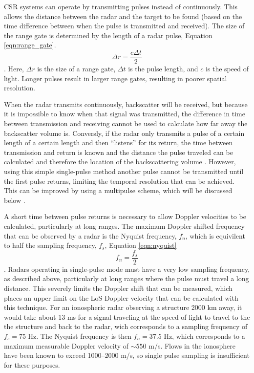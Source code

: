 CSR systems can operate by transmitting pulses instead of continuously.  This allows the distance between the radar and the target to be found (based on the time difference between when the pulse is transmitted and received).  The size of the range gate is determined by the length of a radar pulse, Equation \ref{eqn:range_gate}.\
\begin{equation}
	\label{eqn:range_gate}
	\Delta r = \frac{c\Delta t}{2}
\end{equation}.
Here, \(\Delta r\) is the size of a range gate, \(\Delta t\) is the pulse length, and \(c\) is the speed of light.  Longer pulses result in larger range gates, resulting in poorer spatial resolution.

When the radar transmits continuously, backscatter will be received, but because it is impossible to know when that signal was transmitted, the difference in time between transmission and receiving cannot be used to calculate how far away the backscatter volume is.  Conversly, if the radar only transmits a pulse of a certain length of a certain length and then ``listens'' for its return, the time between transmission and return is known and the distance the pulse traveled can be calculated and therefore the location of the backscattering volume \citep{Farley1972,Greenwald1983}.  However, using this simple single-pulse method another pulse cannot be transmitted until the first pulse returns, limiting the temporal resolution that can be achieved.  This can be improved by using a multipulse scheme, which will be discussed below \citep{Farley1972,Greenwald1983,Greenwald1985}.

A short time between pulse returns is necessary to allow Doppler velocities to be calculated, particularly at long ranges.  The maximum Doppler shifted frequency that can be observed by a radar is the Nyquist frequency, \(f_n\), which is equivilent to half the sampling frequency, \(f_s\), Equation \ref{eqn:nyquist}
\begin{equation}	
	\label{eqn:nyquist}
	f_n = \frac{f_s}{2}
\end{equation}.
Radars operating in single-pulse mode must have a very low sampling frequency, as described above, particularly at long ranges where the pulse must travel a long distance.  This severely limits the Doppler shift that can be measured, which places an upper limit on the LoS Doppler velocity that can be calculated with this technique.  For an ionospheric radar observing a structure 2000 km away, it would take about 13 ms for a signal traveling at the speed of light to travel to the the structure and back to the radar, wich corresponds to a sampling frequency of \(f_s = 75\) Hz.  The Nyquist frequency is then \(f_n = 37.5\) Hz, which corresponds to a maximum measurable Doppler velocity of \(\sim550\) m/s.  Flows in the ionosphere have been known to exceed 1000--2000 m/s, so single pulse sampling is insufficient for these purposes.

